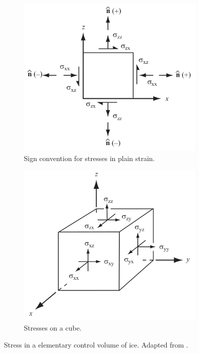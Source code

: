 \documentclass{article}
\begin{document}
\begin{figure}[!h]
	\centering
	\begin{subfigure}{.5\textwidth}
		\centering
		\includegraphics[width=0.99\linewidth]{../fig/Stress_2D.png}
		\caption{Sign convention for stresses in plain strain.}
		\label{Stress2D}
	\end{subfigure}%
	\begin{subfigure}{.5\textwidth}
		\centering
		\includegraphics[width=0.99\linewidth]{../fig/Stress_tensor.png}
		\caption{Stresses on a cube.}
		\label{Stress_tensor}
	\end{subfigure}
	\caption{Stress in a elementary control volume of ice. Adapted from \cite{hooke2019principles}.}
	\label{Stress}
\end{figure}
\end{document}
